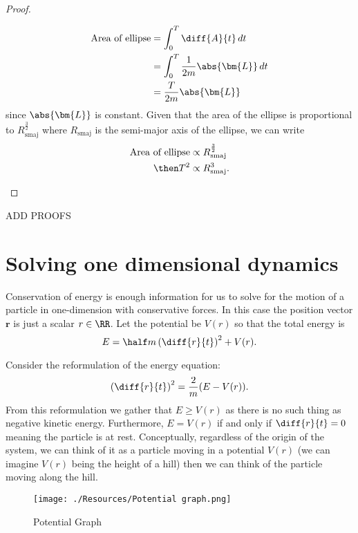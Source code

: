 \documentclass[12pt, a4paper]{article}
\begin{document}
\begin{proof}
\begin{itemize}
        \[\begin{aligned}
            \text{Area of ellipse} &= \int_0^T \diff{A}{t} \, dt \\
            &= \int_0^T \frac{1}{2m} \abs{\bm{L}} \, dt \\
            &= \frac{T}{2m} \abs{\bm{L}}
        \end{aligned}\]
        since \(\abs{\bm{L}}\) is constant. Given that the area of the ellipse is proportional to \(R^{\frac{3}{2}}_{\text{smaj}}\) where \(R_{\text{smaj}}\) is the semi-major axis of the ellipse, we can write 
        \[\begin{aligned}
            \text{Area of ellipse} &\propto R^{\frac{3}{2}}_{\text{smaj}} \\
            \then T^2 &\propto R^{3}_{\text{smaj}}.
        \end{aligned}\]
    \end{itemize}
\end{proof}

\begin{mdthm}
    ADD PROOFS
\end{mdthm}

\section{Solving one dimensional dynamics}

Conservation of energy is enough information for us to solve for the motion of a particle in one-dimension with conservative forces. In this case the position vector \(\bm{r}\) is just a scalar \(r\in \RR\). Let the potential be \(V(r)\) so that the total energy is 
\[E=\half m\left(\diff{r}{t}\right)^2 + V(r).\]

Consider the reformulation of the energy equation:
\[\left(\diff{r}{t}\right)^2 = \frac{2}{m}(E-V(r)).\]
From this reformulation we gather that \(E \geq V(r)\) as there is no such thing as negative kinetic energy. Furthermore, \(E=V(r)\) if and only if \(\diff{r}{t}=0\) meaning the particle is at rest. Conceptually, regardless of the origin of the system, we can think of it as a particle moving in a potential \(V(r)\) (we can imagine \(V(r)\) being the height of a hill) then we can think of the particle moving along the hill.

\begin{figure}[H]
    \begin{center}
        \texttt{[image: ./Resources/Potential graph.png]}
    \end{center}
    \caption{Potential Graph}
\end{figure}
\end{document}
